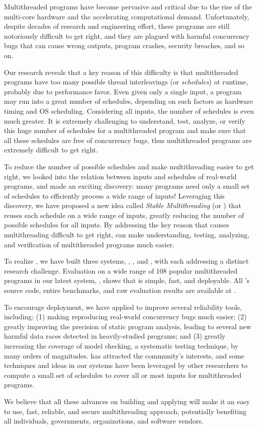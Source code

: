 Multithreaded programs have become pervasive and critical due to the rise of the
multi-core hardware and the accelerating computational demand.
Unfortunately, despite decades of research and engineering effort, these
programs are still notoriously difficult to get right, and they are plagued with
harmful concurrency bugs that can cause wrong outputs, program crashes, security
breaches, and so on.

Our research reveals that a key reason of this difficulty is
that multithreaded programs have too many possible thread interleavings (or
\emph{schedules}) at runtime, probably due to performance favor. Even given 
only a single input, a program may run into a great number of schedules, 
depending on such factors as hardware timing and OS scheduling. Considering all 
inputs, the number of schedules is even much greater. It is extremely 
challenging to understand, test, analyze, or verify this huge number of 
schedules for a multithreaded program and make sure that all these schedules 
are free of concurrency bugs, thus multithreaded programs are extremely 
difficult to get right.

To reduce the number of possible schedules and make multithreading
easier to get right, we looked into the relation between inputs and schedules 
of real-world programs, and made an exciting discovery: many programs need only 
a small set of schedules to efficiently process a wide range of inputs! 
Leveraging this discovery, we have proposed a new idea called \emph{Stable 
Multithreading} (or \emph{\smt}) that reuses each schedule on a wide range of 
inputs, greatly reducing the number of possible schedules for all inputs. By 
addressing the key reason that causes multithreading difficult to get right, 
\smt can make understanding, testing, analyzing, and verification of 
multithreaded programs much easier.

To realize \smt, we have built three \smt systems, \tern, \peregrine, and 
\parrot, with each addressing a distinct research challenge. Evaluation on a 
wide range of 108 popular multithreaded programs in our latest \smt system, 
\parrot, shows that \smt is simple, fast, and deployable. All \parrot's source 
code, entire benchmarks, and raw evaluation results are available at \github.

To encourage deployment, we have applied \smt to improve several reliability 
tools, including: (1) making reproducing
real-world concurrency bugs much easier;  (2) greatly improving the precision of
static program analysis, leading to several new harmful data races detected in
heavily-studied programs; and (3) greatly increasing the coverage of model 
checking, a systematic testing technique, by many orders of magnitudes. \smt 
has attracted the community's interests, and some techniques and ideas in our 
\smt systems have been leveraged by other researchers to compute a small set of 
schedules to cover all or most inputs for multithreaded programs.

We believe that all these advances on building and applying \smt will make it 
an easy to use, fast, reliable, and secure multithreading approach, potentially 
benefiting all individuals, governments, organizations, and software vendors. 

